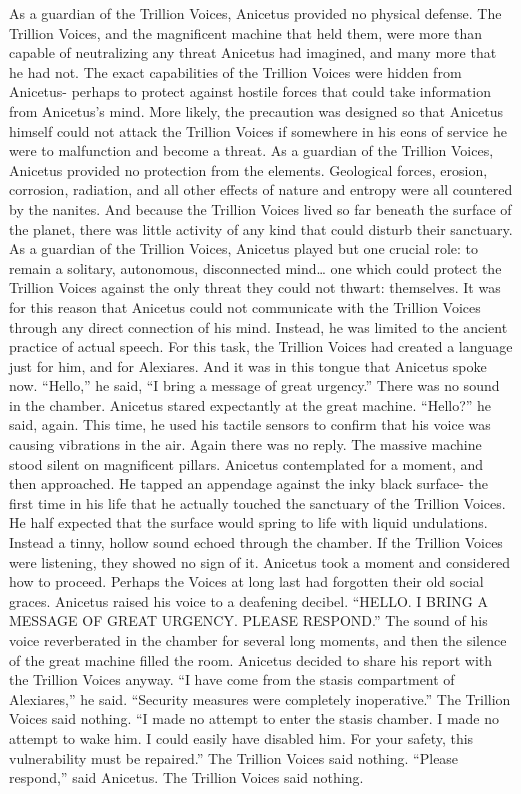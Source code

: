 \documentclass[a4paper]{article}
\begin{document}
As a guardian of the Trillion Voices, Anicetus provided no physical defense. The Trillion Voices, and the magnificent machine that held them, were more than capable of neutralizing any threat Anicetus had imagined, and many more that he had not. The exact capabilities of the Trillion Voices were hidden from Anicetus- perhaps to protect against hostile forces that could take information from Anicetus’s mind. More likely, the precaution was designed so that Anicetus himself could not attack the Trillion Voices if somewhere in his eons of service he were to malfunction and become a threat.
As a guardian of the Trillion Voices, Anicetus provided no protection from the elements. Geological forces, erosion, corrosion, radiation, and all other effects of nature and entropy were all countered by the nanites. And because the Trillion Voices lived so far beneath the surface of the planet, there was little activity of any kind that could disturb their sanctuary.
As a guardian of the Trillion Voices, Anicetus played but one crucial role: to remain a solitary, autonomous, disconnected mind… one which could protect the Trillion Voices against the only threat they could not thwart: themselves. It was for this reason that Anicetus could not communicate with the Trillion Voices through any direct connection of his mind. Instead, he was limited to the ancient practice of actual speech. For this task, the Trillion Voices had created a language just for him, and for Alexiares. And it was in this tongue that Anicetus spoke now.
“Hello,” he said, “I bring a message of great urgency.”
There was no sound in the chamber. Anicetus stared expectantly at the great machine.
“Hello?” he said, again. This time, he used his tactile sensors to confirm that his voice was causing vibrations in the air.
Again there was no reply. The massive machine stood silent on magnificent pillars.
Anicetus contemplated for a moment, and then approached. He tapped an appendage against the inky black surface- the first time in his life that he actually touched the sanctuary of the Trillion Voices. He half expected that the surface would spring to life with liquid undulations. Instead a tinny, hollow sound echoed through the chamber.
If the Trillion Voices were listening, they showed no sign of it. Anicetus took a moment and considered how to proceed. Perhaps the Voices at long last had forgotten their old social graces.
Anicetus raised his voice to a deafening decibel. “HELLO. I BRING A MESSAGE OF GREAT URGENCY. PLEASE RESPOND.”
The sound of his voice reverberated in the chamber for several long moments, and then the silence of the great machine filled the room.
Anicetus decided to share his report with the Trillion Voices anyway. “I have come from the stasis compartment of Alexiares,” he said. “Security measures were completely inoperative.”
The Trillion Voices said nothing.
“I made no attempt to enter the stasis chamber. I made no attempt to wake him. I could easily have disabled him. For your safety, this vulnerability must be repaired.”
The Trillion Voices said nothing.
“Please respond,” said Anicetus.
The Trillion Voices said nothing.
\end{document}
